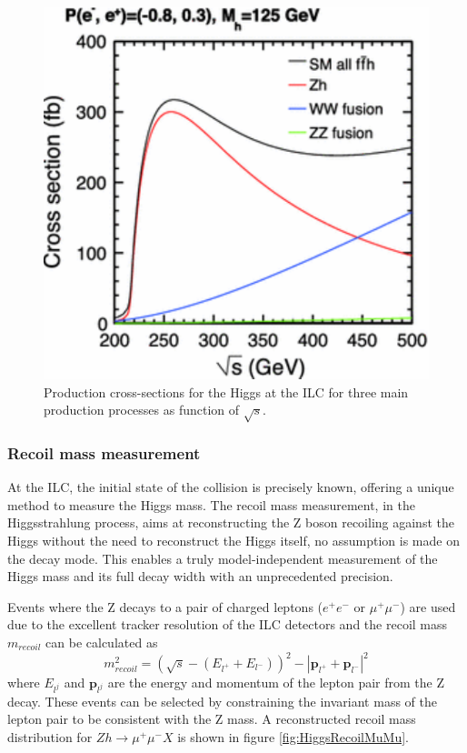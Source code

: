 \begin{figure}[htbp!]
  \centering
  \includegraphics[width=0.5\linewidth]{chap2/fig/HiggsProdXS_Lepton.pdf}
  \caption{Production cross-sections for the Higgs at the ILC for three main production processes as function of $\sqrt{s}$. \cite{Moortgat-Picka:2015yla}} \label{fig:HiggsXS}
\end{figure}

\subsubsection{Recoil mass measurement}

At the ILC, the initial state of the collision is precisely known, offering a unique method to measure the Higgs mass. The recoil mass measurement, in the Higgsstrahlung process, aims at reconstructing the Z boson recoiling against the Higgs without the need to reconstruct the Higgs itself, no assumption is made on the decay mode. This enables a truly model-independent measurement of the Higgs mass and its full decay width with an unprecedented precision.

Events where the Z decays to a pair of charged leptons ($e^+e^-$ or $\mu^+ \mu^-$) are used due to the excellent tracker resolution of the ILC detectors and the recoil mass $m_{recoil}$ can be calculated as \cite{Yan:2016xyx}
\begin{equation}
  m_{recoil}^2 = (\sqrt{s} - (E_{l^+} + E_{l^-}))^2 -  |\textbf{p}_{l^+} + \textbf{p}_{l^-}|^2
\end{equation}
where $E_{l^j}$ and $\textbf{p}_{l^j}$ are the energy and momentum of the lepton pair from the Z decay. These events can be selected by constraining the invariant mass of the lepton pair to be consistent with the Z mass. A reconstructed recoil mass distribution for $Zh \rightarrow \mu^+\mu^-X$ is shown in figure \ref{fig:HiggsRecoilMuMu}.

